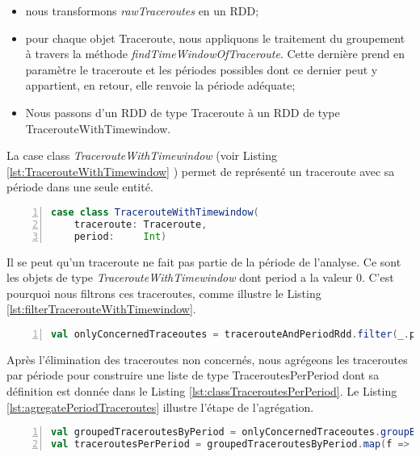 \begin{itemize}
	\item nous transformons  \textit{rawTraceroutes}  en un RDD;
	\item pour chaque objet Traceroute, nous appliquons le traitement du groupement à travers la méthode \textit{findTimeWindowOfTraceroute}. Cette dernière prend en paramètre le traceroute et les périodes possibles dont ce dernier peut y appartient, en retour, elle renvoie la période adéquate;
	\item Nous passons d'un RDD de type Traceroute à un RDD de type TracerouteWithTimewindow.
\end{itemize}

La case class \textit{TracerouteWithTimewindow} (voir Listing \ref{lst:TracerouteWithTimewindow} ) permet de représenté un traceroute avec sa période dans une seule entité. 
\begin{lstlisting}[language=scala,firstnumber=1, caption={La classe TracerouteWithTimewindow },label={lst:TracerouteWithTimewindow}, basicstyle = \small,escapechar=|,numbers=left,
stepnumber=1]
case class TracerouteWithTimewindow(
	traceroute: Traceroute,
	period:     Int)
\end{lstlisting}


Il se peut qu'un traceroute ne fait pas partie de la période de l'analyse. Ce sont les objets de type \textit{TracerouteWithTimewindow}  dont  period a la valeur $0$. C'est pourquoi nous filtrons ces traceroutes, comme illustre le Listing  \ref{lst:filterTracerouteWithTimewindow}.

\begin{lstlisting}[language=scala,firstnumber=1, caption={La classe TracerouteWithTimewindow },label={lst:filterTracerouteWithTimewindow}, basicstyle = \footnotesize,escapechar=|,numbers=left,
stepnumber=1]
val onlyConcernedTraceoutes = tracerouteAndPeriodRdd.filter(_.period != 0)
\end{lstlisting}

Après l'élimination des traceroutes non concernés, nous agrégeons les traceroutes par période pour construire une liste de type   TraceroutesPerPeriod dont sa définition est  donnée dans le Listing \ref{lst:classTraceroutesPerPeriod}. Le Listing \ref{lst:agregatePeriodTraceroutes} illustre l'étape de l'agrégation.


\begin{lstlisting}[language=scala,firstnumber=1, caption={La classe TracerouteWithTimewindow },label={lst:agregatePeriodTraceroutes}, basicstyle = \footnotesize,escapechar=|,numbers=left,
stepnumber=1]
val groupedTraceroutesByPeriod = onlyConcernedTraceoutes.groupBy(_.period)
val traceroutesPerPeriod = groupedTraceroutesByPeriod.map(f => TraceroutesPerPeriod(f._2.map(f => f.traceroute).toSeq, f._1))
\end{lstlisting}


